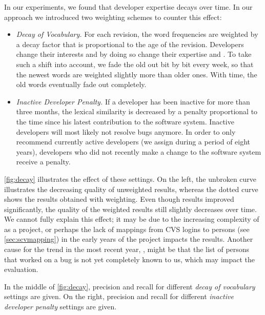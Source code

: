 In our experiments, we found that developer expertise decays over time. In our approach we introduced two weighting schemes to counter this effect: 

\begin{itemize}
\item \emph{Decay of Vocabulary.} For each revision, the word frequencies are weighted by a decay factor that is proportional to the age of the revision. Developers change their interests and by doing so change their expertise and \VOC. To take such a shift into account, we fade the old \VOC out bit by bit every week, so that the newest words are weighted slightly more than older ones. With time, the old words eventually fade out completely.
\item \emph{Inactive Developer Penalty.} If a developer has been inactive for more than three months, the lexical similarity is decreased by a penalty proportional to the time since his latest contribution to the software system. Inactive developers will most likely not resolve bugs anymore. In order to only recommend currently active developers (we assign \BRs during a period of eight years), developers who did not recently make a change to the software system receive a penalty.
\end{itemize}

\noindent \autoref{fig:decay} illustrates the effect of these settings. On the left, the unbroken curve illustrates the decreasing quality of unweighted results, whereas the dotted curve shows the results obtained with weighting. Even though results improved significantly, the quality of the weighted results still slightly decreases over time. We cannot fully explain this effect; it may be due to the increasing complexity of \EC as a project, or perhaps the lack of mappings from CVS logins to persons (see \autoref{sec:scvmapping}) in the early years of the project impacts the results. Another cause for the trend in the most recent year, , might be that the list of persons that worked on a bug is not yet completely known to us, which may impact the evaluation.


In the middle of \autoref{fig:decay}, precision and recall for different \emph{decay of vocabulary} settings are given. On the right, precision and recall for different \emph{inactive developer penalty} settings are given. 

